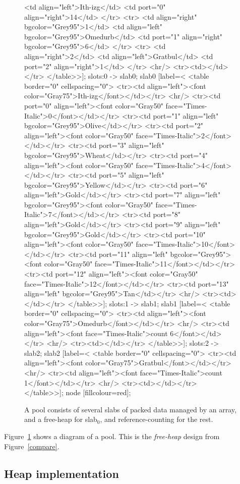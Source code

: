 \documentclass[12pt]{article}
\begin{document}
\begin{figure}
{		<td align="left">Ith-izg</td>
		<td port="0" align="right">14</td>
	</tr>
	<tr>
		<td align="right" bgcolor="Grey95">1</td>
		<td align="left" bgcolor="Grey95">Omedurb</td>
		<td port="1" align="right" bgcolor="Grey95">6</td>
	</tr>
	<tr>
		<td align="right">2</td>
		<td align="left">Gratbul</td>
		<td port="2" align="right">1</td>
	</tr>
	<hr/>
	<tr><td></td></tr>
</table>>];
	slots:0 -> slab0;
	slab0 [label=<
<table border="0" cellspacing="0">
	<tr><td align="left"><font color="Gray75">Ith-izg</font></td></tr>
	<hr/>
	<tr><td port="0" align="left"><font color="Gray50" face="Times-Italic">0</font></td></tr>
	<tr><td port="1" align="left" bgcolor="Grey95">Olive</td></tr>
	<tr><td port="2" align="left"><font color="Gray50" face="Times-Italic">2</font></td></tr>
	<tr><td port="3" align="left" bgcolor="Grey95">Wheat</td></tr>
	<tr><td port="4" align="left"><font color="Gray50" face="Times-Italic">4</font></td></tr>
	<tr><td port="5" align="left" bgcolor="Grey95">Yellow</td></tr>
	<tr><td port="6" align="left">Gold</td></tr>
	<tr><td port="7" align="left" bgcolor="Grey95"><font color="Gray50" face="Times-Italic">7</font></td></tr>
	<tr><td port="8" align="left">Gold</td></tr>
	<tr><td port="9" align="left" bgcolor="Grey95">Gold</td></tr>
	<tr><td port="10" align="left"><font color="Gray50" face="Times-Italic">10</font></td></tr>
	<tr><td port="11" align="left" bgcolor="Grey95"><font color="Gray50" face="Times-Italic">11</font></td></tr>
	<tr><td port="12" align="left"><font color="Gray50" face="Times-Italic">12</font></td></tr>
	<tr><td port="13" align="left" bgcolor="Grey95">Tan</td></tr>
	<hr/>
	<tr><td></td></tr>
</table>>];
	slots:1 -> slab1;
	slab1 [label=<
<table border="0" cellspacing="0">
	<tr><td align="left"><font color="Gray75">Omedurb</font></td></tr>
	<hr/>
	<tr><td align="left"><font face="Times-Italic">count 6</font></td></tr>
	<hr/>
	<tr><td></td></tr>
</table>>];
	slots:2 -> slab2;
	slab2 [label=<
<table border="0" cellspacing="0">
	<tr><td align="left"><font color="Gray75">Gratbul</font></td></tr>
	<hr/>
	<tr><td align="left"><font face="Times-Italic">count 1</font></td></tr>
	<hr/>
	<tr><td></td></tr>
</table>>];
	node [fillcolour=red];
	}
	\caption{A pool consists of several slabs of packed data managed by an array, and a free-heap for slab$_0$, and reference-counting for the rest.}
	\label{pool}
\end{figure}

Figure~\ref{pool} shows a diagram of a pool. This is the {\it free-heap} design from Figure~\ref{compare}.

\subsection{Heap implementation}
\end{document}
